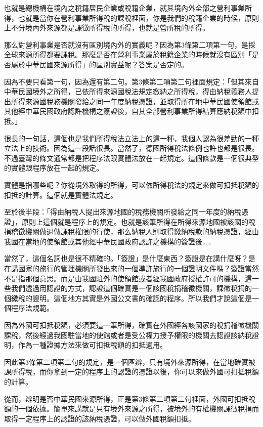 \documentclass[]{ctexbook}
\begin{document}
也就是總機構在境內之稅籍居民企業或稅籍企業，就其境內外全部之營利事業所得，也就是當你在營利事業所得稅的課稅裡面，你是我們的稅籍企業的時候，原則上不分境內外來源都是課徵所得稅的所得，也就是營所稅的所得。

那么對營利事業是否就沒有區別境內外的實義呢？因為第3條第二項第一句，是採全球來源所得都要課稅。那麼是否在營利事業屬於稅籍企業的時候就沒有區別「是否屬於中華民國來源所得」的區別實益呢？答案是否定的。

因為不要只看第一句，因為還有第二句。第3條第二項第二句裡面規定：「但其來自中華民國境外之所得，已依所得來源國稅法規定繳納之所得稅，得由納稅義務人提出所得來源國稅務機關發給之同一年度納稅憑證，並取得所在地中華民國使領館或其他經中華民國政府認許機構之簽證後，自其全部營利事業所得結算應納稅額中扣抵。」

很長的一句話，這個也是我們所得稅法立法上的這一種，我個人認為很差勁的一種立法上的技術。因為這一段話很長。當然了，德國所得稅法條例也許也都是很長。不過臺灣的條文通常都是把程序法跟實體法放在一起規定。這個條款是一個很典型的實體跟程序放在一起的規定。

實體是指哪些呢？你從境外取得的所得，可以依所得稅法的規定來做可扣抵稅額的扣抵的計算。這個就是實體法規定。

至於後半段：「得由納稅人提出來源地國的稅務機關所發給之同一年度的納稅憑證」，原則上這個就是程序上的規定。也就是該筆所得在所得來源地國被該國的稅捐稽徵機關做過做課稅權限的行使，那么納稅人則取得繳納稅款的納稅憑證，經由我國在當地的使領館或其他經中華民國政府認許之機構的簽證後\ldots\ldots{}

當然了，這個名詞也是很不精確的。「簽證」是什麼東西？簽證是在講什麼呀？是在講國家的旅行的管理機關所發出來的一個準許旅行的一個證明文件嗎？簽證當然不是指那個意思。而是由我國駐外的使領館或者經我國政府授權許可的機構，這一些我們透過用認證的方式，認證這個確實是一個該國稅捐稽徵機關，課徵稅捐的一個繳稅的證明。這個地方其實是外國公文書的確認的程序。所以我們才說這個是一個程序法規範。

因為外國可扣抵稅額，必須要這一筆所得，確實在外國經各該國家的稅捐稽徵機關課稅，然後經過我國駐當地的使館或者是受公權力授予權限的機關去認證該納稅證明，作為一種證據方法來做可扣抵稅額的扣抵適用。

因此第3條第二項第二句的規定，是一個區辨，只有境外來源所得，在當地確實被課所得稅，而你拿到一定的程序上的認證的憑證以後，你可以來做外國可扣抵稅額的計算。

從而，辨明是否中華民國來源所得，正是第3條第二項第二句裡面，外國可扣抵稅額的一個依據。簡單來講就是只有境外來源之所得，被境外的有權機關課徵稅捐而取得一定程序上的認證的該納稅憑證，可以做外國稅額扣抵。
\end{document}
